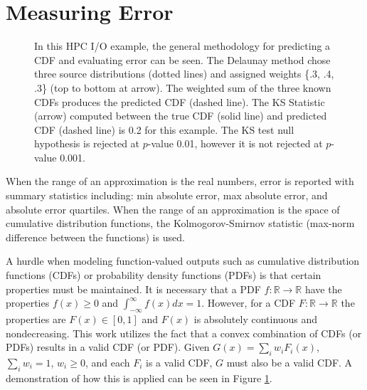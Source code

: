 \documentclass[smallextended,final]{svjour3}       %
\begin{document}
\section{Measuring Error}
\label{sec:error}

\begin{figure}[htb]
  \centering
  \vspace{-0.3cm}
  \caption{In this HPC I/O example, the general methodology for predicting a CDF and evaluating error can be seen. The Delaunay method chose three source distributions (dotted lines) and assigned weights \{.3, .4, .3\} (top to bottom at arrow). The weighted sum of the three known CDFs produces the predicted CDF (dashed line). The KS Statistic (arrow) computed between the true CDF (solid line) and predicted CDF (dashed line) is 0.2 for this example. The KS test null hypothesis is rejected at $p$-value 0.01, however it is not rejected at $p$-value 0.001.
  \vspace{-.1cm}}
  \label{fig:prediction-example}
\end{figure}

When the range of an approximation is the real numbers, error is reported
with summary statistics including: min absolute error, max absolute error,
and absolute error quartiles. When the range of an approximation is the
space of cumulative distribution functions, the Kolmogorov-Smirnov statistic
(max-norm difference between the functions) is used.

A hurdle when modeling function-valued outputs such as cumulative
distribution functions (CDFs) or probability density functions (PDFs) is
that certain properties must be maintained. It is necessary that a PDF $f:
\mathbb{R} \rightarrow \mathbb{R}$ have the properties $f(x) \geq 0$ and
$\int_{-\infty}^{\infty}f(x)dx = 1$. However, for a CDF $F: \mathbb{R}
\rightarrow \mathbb{R}$ the properties are $F(x) \in [0,1]$ and $F(x)$ is
absolutely continuous and nondecreasing. This work utilizes the fact that
a convex combination of CDFs (or PDFs) results in a valid CDF (or PDF).
Given $G(x) = \sum_{i}w_i F_i(x)$, $\sum_{i} w_i = 1$, $w_i \geq 0$, and
each $F_i$ is a valid CDF, $G$ must also be a valid CDF. A demonstration
of how this is applied can be seen in Figure \ref{fig:prediction-example}.
\end{document}
